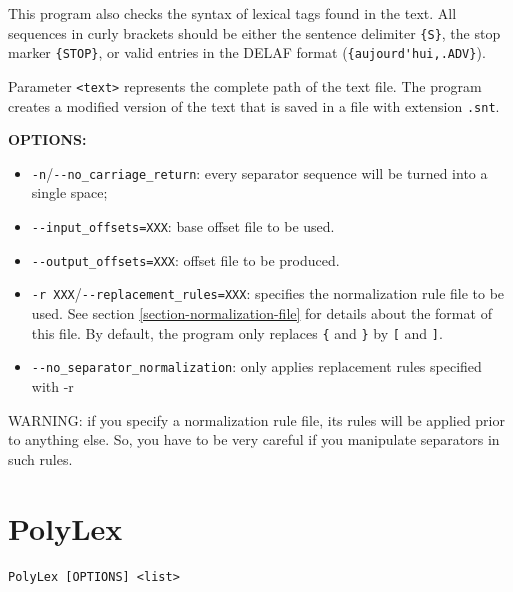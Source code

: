\bigskip
\noindent This program also checks the syntax of lexical tags found in the text. All
sequences in curly brackets should be either the sentence delimiter \verb+{S}+,
the stop marker \verb+{STOP}+, or valid entries in the DELAF format (\verb+{aujourd'hui,.ADV}+). 

\bigskip
\noindent {}Parameter \verb+<text>+ 
represents the complete path of the text file. The program
creates a modified version of the text that is saved in a file with extension
\verb+.snt+.

\bigskip
\noindent \textbf{OPTIONS:}
\begin{itemize}
  \item \verb+-n+/\verb+--no_carriage_return+: every separator sequence will be turned into a single space;
  \item \verb+--input_offsets=XXX+: base offset file to be used.
  \item \verb+--output_offsets=XXX+: offset file to be produced.
  \item \verb+-r XXX+/\verb+--replacement_rules=XXX+: specifies the
  normalization rule file to be used. See section \ref{section-normalization-file} 
  for details about the format of
  this file. By default, the program only replaces \verb+{+ and \verb+}+ by
  \verb+[+ and \verb+]+.
  \item \verb+--no_separator_normalization+: only applies replacement rules specified with -r
\end{itemize}

\bigskip
\noindent WARNING: if you specify a normalization rule file, its rules will be
applied prior to anything else. So, you have to be very careful if you
manipulate separators in such rules.






\section{PolyLex}
\verb+PolyLex [OPTIONS] <list>+

